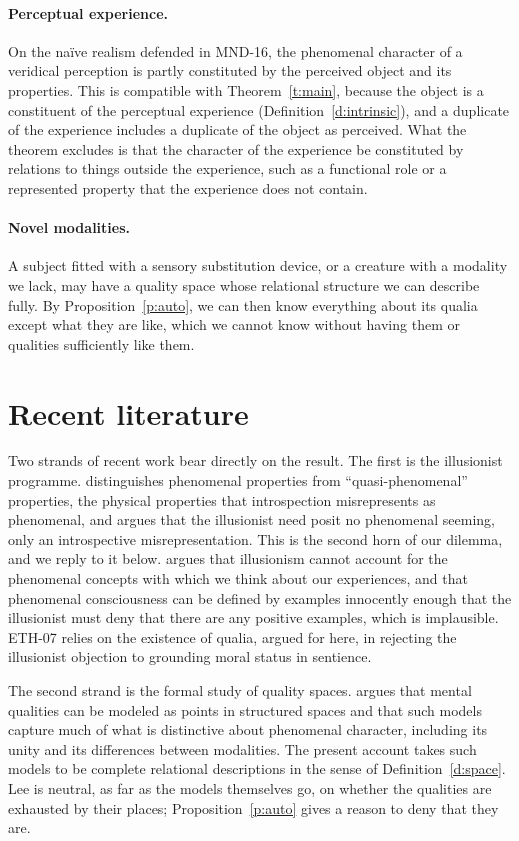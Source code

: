 \documentclass{situationist-preprint}
\begin{document}
\paragraph{Perceptual experience.} On the naïve realism defended in MND-16, the phenomenal character of a veridical perception is partly constituted by the perceived object and its properties. This is compatible with Theorem~\ref{t:main}, because the object is a constituent of the perceptual experience (Definition~\ref{d:intrinsic}), and a duplicate of the experience includes a duplicate of the object as perceived. What the theorem excludes is that the character of the experience be constituted by relations to things outside the experience, such as a functional role or a represented property that the experience does not contain.

\paragraph{Novel modalities.} A subject fitted with a sensory substitution device, or a creature with a modality we lack, may have a quality space whose relational structure we can describe fully. By Proposition~\ref{p:auto}, we can then know everything about its qualia except what they are like, which we cannot know without having them or qualities sufficiently like them.

\section{Recent literature}

Two strands of recent work bear directly on the result. The first is the illusionist programme. \citet{Frankish2016} distinguishes phenomenal properties from \enquote{quasi-phenomenal} properties, the physical properties that introspection misrepresents as phenomenal, and argues that the illusionist need posit no phenomenal seeming, only an introspective misrepresentation. This is the second horn of our dilemma, and we reply to it below. \citet{Balog2016} argues that illusionism cannot account for the phenomenal concepts with which we think about our experiences, and \citet{Schwitzgebel2016} that phenomenal consciousness can be defined by examples innocently enough that the illusionist must deny that there are any positive examples, which is implausible. ETH-07 relies on the existence of qualia, argued for here, in rejecting the illusionist objection to grounding moral status in sentience.

The second strand is the formal study of quality spaces. \citet{Lee2021} argues that mental qualities can be modeled as points in structured spaces and that such models capture much of what is distinctive about phenomenal character, including its unity and its differences between modalities. The present account takes such models to be complete relational descriptions in the sense of Definition~\ref{d:space}. Lee is neutral, as far as the models themselves go, on whether the qualities are exhausted by their places; Proposition~\ref{p:auto} gives a reason to deny that they are.
\end{document}
